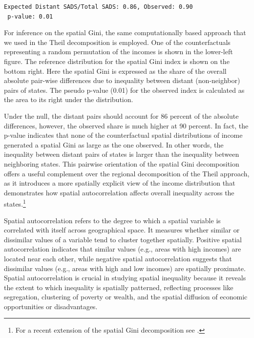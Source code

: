 \documentclass[
  a4paper, 
  twoside,
  final
]{article}
\begin{document}
\begin{verbatim}
Expected Distant SADS/Total SADS: 0.86, Observed: 0.90
 p-value: 0.01
\end{verbatim}

For inference on the spatial Gini, the same computationally based
approach that we used in the Theil decomposition is employed. One of the
counterfactuals representing a random permutation of the incomes is
shown in the lower-left figure. The reference distribution for the
spatial Gini index is shown on the bottom right. Here the spatial Gini
is expressed as the share of the overall absolute pair-wise differences
due to inequality between distant (non-neighbor) pairs of states. The
pseudo p-value (0.01) for the observed index is calculated as the area
to its right under the distribution.

Under the null, the distant pairs should account for 86 percent of the
absolute differences, however, the observed share is much higher at 90
percent. In fact, the p-value indicates that none of the counterfactual
spatial distributions of income generated a spatial Gini as large as the
one observed. In other words, the inequality between distant pairs of
states is larger than the inequality between neighboring states. This
pairwise orientation of the spatial Gini decomposition offers a useful
complement over the regional decomposition of the Theil approach, as it
introduces a more spatially explicit view of the income distribution
that demonstrates how spatial autocorrelation affects overall inequality
across the states.\footnote{For a recent extension of the spatial Gini
  decomposition see \citet{panzera2020MeasuringSpatial}.}

Spatial autocorrelation refers to the degree to which a spatial variable
is correlated with itself across geographical space. It measures whether
similar or dissimilar values of a variable tend to cluster together
spatially. Positive spatial autocorrelation indicates that similar
values (e.g., areas with high incomes) are located near each other,
while negative spatial autocorrelation suggests that dissimilar values
(e.g., areas with high and low incomes) are spatially proximate. Spatial
autocorrelation is crucial in studying spatial inequality because it
reveals the extent to which inequality is spatially patterned,
reflecting processes like segregation, clustering of poverty or wealth,
and the spatial diffusion of economic opportunities or disadvantages.
\end{document}
